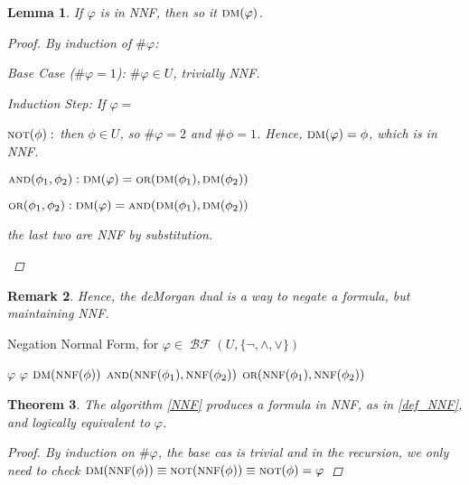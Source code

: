 \documentclass[12pt]{article}
\let\aand\wedge
\let\oor\vee
\newcommand{\scr}[1]{{\scriptstyle\textup{#1}}}
\newcommand{\scrf}[1]{{\scriptstyle\textup{\footnotesize #1}}}
\DeclareMathOperator{\BF}{\mathcal{BF}}
\DeclareMathOperator{\NOT}{\scr{NOT}}
\DeclareMathOperator{\OR}{\scr{OR}}
\DeclareMathOperator{\AND}{\scr{AND}}
\newtheorem{theorem}{Theorem}[subsection]
\newtheorem{lemma}[theorem]{Lemma}
\newtheorem{remark}[theorem]{Remark}
\begin{document}
\begin{lemma}
  If $\varphi$ is in NNF, then so it $\scrf{DM}(\varphi)$.
  \begin{proof}
    By induction of $\#\varphi$:
    \begin{compactitem}
      \item Base Case ($\#\varphi=1$): $\#\varphi\in U$, trivially NNF.
      \item Induction Step: If $\varphi=$ 
      \begin{compactenum}[(i)]
        \item $\NOT(\phi):$ then $\phi\in U$, so $\#\varphi=2$ and $\#\phi=1$. Hence, $\scrf{DM}(\varphi)=\phi$, which is in NNF.
        \item $\AND(\phi_1,\phi_2): \scrf{DM}(\varphi)=\OR(\scrf{DM}(\phi_1),\scrf{DM}(\phi_2))$
        \item $\OR(\phi_1,\phi_2): \scrf{DM}(\varphi)=\AND(\scrf{DM}(\phi_1),\scrf{DM}(\phi_2))$
      \end{compactenum}
      the last two are NNF by substitution.
    \end{compactitem}
  \end{proof}
\end{lemma}

\begin{remark}
  Hence, the deMorgan dual is a way to negate a formula, but maintaining NNF.
\end{remark}

\begin{algorithm}[H]
  \caption{Negation Normal Form, for $\varphi\in\BF(U,\{\neg,\aand,\oor\})$}
  \begin{algorithmic}
    \Function{$\scrf{NNF}$}{$\varphi$}
       \Return $\varphi$
      \ElsIf{$\varphi=\NOT(\phi)$}
         \Return $\varphi$
        \Else{} \Return $\scrf{DM}(\scrf{NNF}(\phi))$
        \EndIf
      \ElsIf{$\varphi=\AND(\phi_1,\phi_2)$} \Return $\AND(\scrf{NNF}(\phi_1),\scrf{NNF}(\phi_2))$
      \ElsIf{$\varphi=\OR(\phi_1,\phi_2)$} \Return $\OR(\scrf{NNF}(\phi_1),\scrf{NNF}(\phi_2))$
      \EndIf
    \EndFunction
  \end{algorithmic}
  \label{NNF}
\end{algorithm}

\begin{theorem}
  The algorithm \ref{NNF} produces a formula in NNF, as in \ref{def_NNF}, and logically equivalent to $\varphi$.
  \begin{proof}
    By induction on $\#\varphi$, the base cas is trivial and in the recursion, we only need to check $\scrf{DM}(\scrf{NNF}(\phi))\equiv\NOT(\scrf{NNF}(\phi))\equiv\NOT(\phi)=\varphi$
  \end{proof}
\end{theorem}
\end{document}
